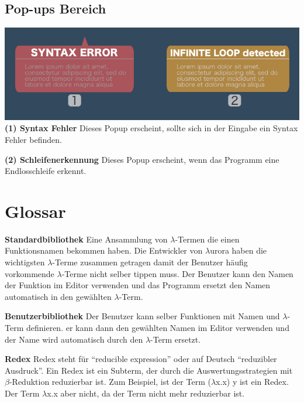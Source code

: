 \documentclass[parskip=full,11pt,twoside]{scrartcl}
\begin{document}
\subsection{Pop-ups Bereich}
\includegraphics[width=\textwidth]{../GUI-Design/tutorials/Tutorial_Popups_Section.png}
\newline
\newline
\textbf{(1) Syntax Fehler}
\newline Dieses Popup erscheint, sollte sich in der Eingabe ein Syntax Fehler befinden.

\textbf{(2) Schleifenerkennung}
\newline Dieses Popup erscheint, wenn das Programm eine Endlosschleife erkennt.


\newpage
\section{Glossar}

\textbf{Standardbibliothek}
\newline
Eine Ansammlung von $\lambda$-Termen die einen Funktionsnamen bekommen haben. Die Entwickler von $\lambda$urora haben die wichtigsten $\lambda$-Terme zusammen getragen damit der Benutzer häufig vorkommende $\lambda$-Terme nicht selber tippen muss. Der Benutzer kann den Namen der Funktion im Editor verwenden und das Programm ersetzt den Namen automatisch in den gewählten $\lambda$-Term.

\textbf{Benutzerbibliothek}
\newline
Der Benutzer kann selber Funktionen mit Namen und $\lambda$-Term definieren. er kann dann den gewählten Namen im Editor verwenden und der Name wird automatisch durch den $\lambda$-Term ersetzt.

\textbf {Redex}
\newline
Redex steht für \enquote{reducible expression} oder auf Deutsch \enquote{reduzibler Ausdruck}. Ein Redex ist ein Subterm, der durch die Auswertungsstrategien mit $\beta$-Reduktion reduzierbar ist.
\newline
Zum Beispiel, ist der Term ($\lambda$x.x) y ist ein Redex. Der Term $\lambda$x.x aber nicht, da der Term nicht mehr reduzierbar ist.
\end{document}
